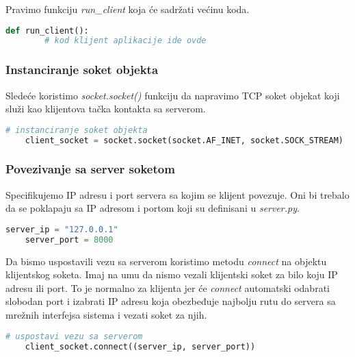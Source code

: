 Pravimo funkciju \emph{run\_client} koja će sadržati većinu koda.

\vspace{0.5cm}

\begin{lstlisting}[language = Python]
    def run_client():
        # kod klijent aplikacije ide ovde
\end{lstlisting}

\subsubsection{Instanciranje soket objekta}
Sledeće koristimo \emph{socket.socket()} funkciju da napravimo TCP soket objekat koji služi kao klijentova tačka kontakta sa serverom.

\vspace{0.5cm}

\begin{lstlisting}[language = Python]
    # instanciranje soket objekta
    client_socket = socket.socket(socket.AF_INET, socket.SOCK_STREAM)
\end{lstlisting}

\subsubsection{Povezivanje sa server soketom}

Specifikujemo IP adresu i port servera sa kojim se klijent povezuje. Oni bi trebalo da se poklapaju sa IP adresom i portom koji su definisani u \emph{server.py}.

\vspace{0.5cm}

\begin{lstlisting}[language = Python]
    server_ip = "127.0.0.1"
    server_port = 8000
\end{lstlisting}

Da bismo uspostavili vezu sa serverom koristimo metodu \emph{connect} na objektu klijentskog soketa. Imaj na umu da nismo vezali klijentski soket za bilo koju IP adresu ili port. To je normalno za klijenta jer će \emph{connect} automatski odabrati slobodan port i izabrati IP adresu koja obezbeđuje najbolju rutu do servera sa mrežnih interfejsa sistema i vezati soket za njih.

\vspace{0.5cm}

\begin{lstlisting}[language = Python]
    # uspostavi vezu sa serverom
    client_socket.connect((server_ip, server_port))
\end{lstlisting}

